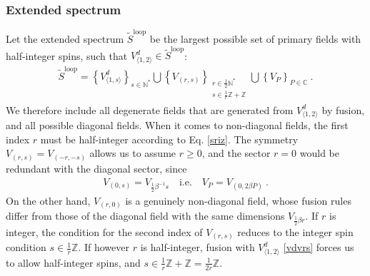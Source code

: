 \documentclass[12pt, a4paper]{article}
\theoremstyle{break}
\begin{document}
\subsubsection{Extended spectrum}

Let the extended spectrum $\widetilde{S}^\text{loop}$ be the largest possible set of primary fields with half-integer spins, such that $V^d_{\langle 1,2\rangle}\in \widetilde{S}^\text{loop}$:
\begin{align}
 \boxed{\widetilde{S}^\text{loop} = \left\{V^d_{\langle 1,s\rangle}\right\}_{s\in\mathbb{N}^*}  \bigcup \left\{V_{(r,s)}\right\}_{\substack{r\in \frac12\mathbb{N}^*\\ s\in\frac{1}{r}\mathbb{Z}+\mathbb{Z}}}\bigcup \left\{ V_P\right\}_{P\in\mathbb{C}} } \ .
\end{align}
We therefore include all degenerate fields that are generated from $V^d_{\langle 1,2\rangle}$ by fusion, and all possible diagonal fields. When it comes to non-diagonal fields, the first index $r$ must be half-integer according to Eq. \eqref{sriz}. The symmetry $V_{(r,s)}=V_{(-r,-s)}$ allows us to assume $r\geq 0$, and the sector $r=0$ would be redundant with the diagonal sector, since 
\begin{align}
 V_{(0,s)} = V_{\frac12\beta^{-1}s}  \quad \text{i.e.} \quad V_P = V_{(0,2\beta P)} \ .
 \label{sP}
\end{align}
On the other hand, $V_{(r,0)}$ is a genuinely non-diagonal field, whose fusion rules differ from those of the diagonal field with the same dimensions $V_{\frac12\beta r}$. 
If $r$ is integer, the condition for the second index of $V_{(r,s)}$ reduces to the integer spin condition $s\in\frac{1}{r}\mathbb{Z}$. If however $r$ is half-integer, fusion with $V^d_{\langle 1,2\rangle}$ \eqref{vdvrs} forces us to allow half-integer spins, and $s\in \frac{1}{r}\mathbb{Z} + \mathbb{Z} = \frac{1}{2r}\mathbb{Z}$. 
\end{document}
